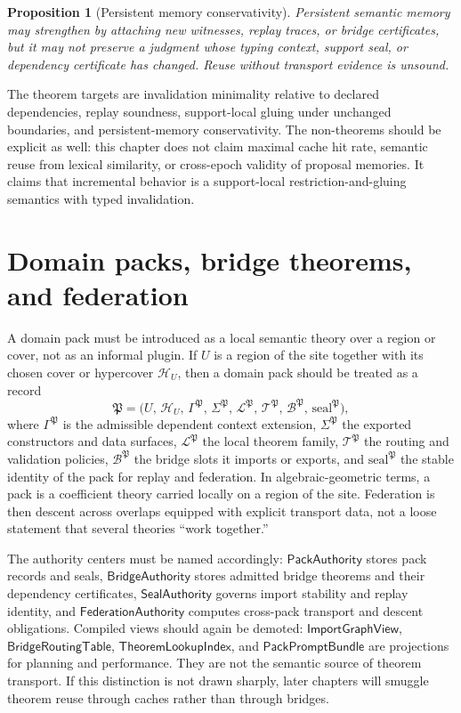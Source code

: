 \documentclass[11pt]{report}
\newtheorem{proposition}[definition]{Proposition}
\begin{document}
\begin{proposition}[Persistent memory conservativity]
Persistent semantic memory may strengthen by attaching new witnesses, replay traces, or bridge certificates, but it may not preserve a judgment whose typing context, support seal, or dependency certificate has changed. Reuse without transport evidence is unsound.
\end{proposition}

The theorem targets are invalidation minimality relative to declared dependencies, replay soundness, support-local gluing under unchanged boundaries, and persistent-memory conservativity. The non-theorems should be explicit as well: this chapter does not claim maximal cache hit rate, semantic reuse from lexical similarity, or cross-epoch validity of proposal memories. It claims that incremental behavior is a support-local restriction-and-gluing semantics with typed invalidation.

\chapter{Domain packs, bridge theorems, and federation}
A domain pack must be introduced as a local semantic theory over a region or cover, not as an informal plugin. If $U$ is a region of the site together with its chosen cover or hypercover $\mathcal{H}_U$, then a domain pack should be treated as a record
\[
\mathfrak{P}
=
\bigl(
U,\,
\mathcal{H}_U,\,
\Gamma^{\mathfrak{P}},\,
\Sigma^{\mathfrak{P}},\,
\mathcal{L}^{\mathfrak{P}},\,
\mathcal{T}^{\mathfrak{P}},\,
\mathcal{B}^{\mathfrak{P}},\,
\mathrm{seal}^{\mathfrak{P}}
\bigr),
\]
where $\Gamma^{\mathfrak{P}}$ is the admissible dependent context extension, $\Sigma^{\mathfrak{P}}$ the exported constructors and data surfaces, $\mathcal{L}^{\mathfrak{P}}$ the local theorem family, $\mathcal{T}^{\mathfrak{P}}$ the routing and validation policies, $\mathcal{B}^{\mathfrak{P}}$ the bridge slots it imports or exports, and $\mathrm{seal}^{\mathfrak{P}}$ the stable identity of the pack for replay and federation. In algebraic-geometric terms, a pack is a coefficient theory carried locally on a region of the site. Federation is then descent across overlaps equipped with explicit transport data, not a loose statement that several theories ``work together.''

The authority centers must be named accordingly: $\mathsf{PackAuthority}$ stores pack records and seals, $\mathsf{BridgeAuthority}$ stores admitted bridge theorems and their dependency certificates, $\mathsf{SealAuthority}$ governs import stability and replay identity, and $\mathsf{FederationAuthority}$ computes cross-pack transport and descent obligations. Compiled views should again be demoted: $\mathsf{ImportGraphView}$, $\mathsf{BridgeRoutingTable}$, $\mathsf{TheoremLookupIndex}$, and $\mathsf{PackPromptBundle}$ are projections for planning and performance. They are not the semantic source of theorem transport. If this distinction is not drawn sharply, later chapters will smuggle theorem reuse through caches rather than through bridges.
\end{document}
